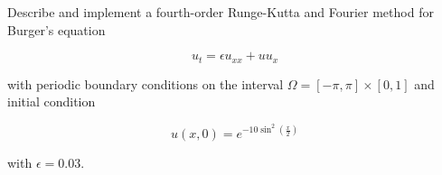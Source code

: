 Describe and implement a fourth-order Runge-Kutta and Fourier method for Burger's equation 

$$
u_t = \epsilon u_{xx} + u u_x
$$

with periodic boundary conditions on the interval $\Omega = [-\pi, \pi] \times [0, 1]$ and initial condition

$$
u(x, 0) = e^{-10 \sin^2{\left( \frac{x}{2} \right)}}
$$

with $\epsilon = 0.03$.

\begin{solution}
  \ \\
  \vfill
\end{solution}